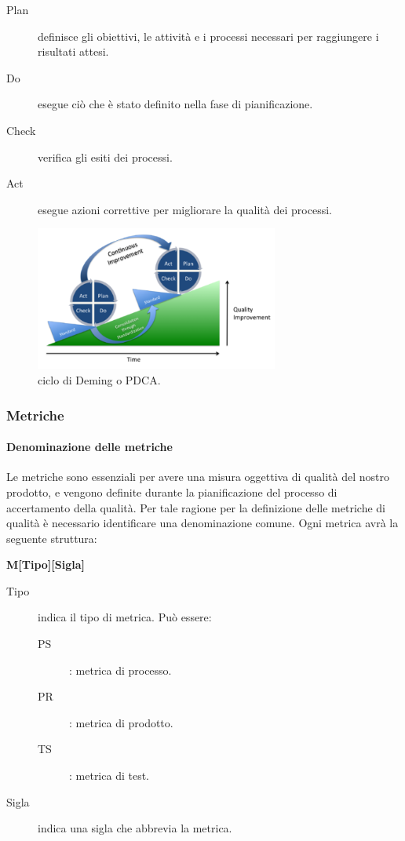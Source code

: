\documentclass[../../norme-di-progetto.tex]{subfiles}
\begin{document}
\begin{description}
  \item [Plan] definisce gli obiettivi, le attività e i processi necessari per raggiungere i risultati attesi.
  \item [Do] esegue ciò che è stato definito nella fase di pianificazione.
  \item [Check] verifica gli esiti dei processi.
  \item [Act] esegue azioni correttive per migliorare la qualità dei processi.
\end{description}
\begin{figure}[H]
  \includegraphics[width=8cm]{PDCA-process.png}
  \centering
  \caption{ciclo di Deming o PDCA.}
\end{figure}

\subsubsection{Metriche}%
\label{subs:accertamento_della_qualita/metriche}

\paragraph{Denominazione delle metriche}%
\label{par:denominazione_delle_metriche}

Le metriche sono essenziali per avere una misura oggettiva di qualità del nostro prodotto, e vengono definite durante la pianificazione del processo di accertamento della qualità.
Per tale ragione per la definizione delle metriche di qualità è necessario identificare una denominazione comune.
Ogni metrica avrà la seguente struttura:
\begin{center}
  \textbf{M[Tipo][Sigla]}
\end{center}
\begin{description}
  \item [Tipo] indica il tipo di metrica. Può essere:
        \begin{description}
          \item[PS]: metrica di processo.
          \item[PR]: metrica di prodotto.
          \item[TS]: metrica di test.
        \end{description}
  \item [Sigla] indica una sigla che abbrevia la metrica.
\end{description}
\end{document}
